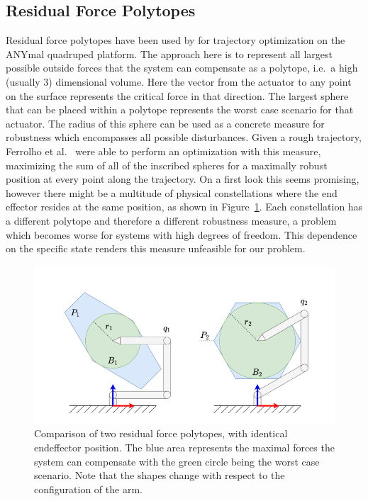 \subsection{Residual Force Polytopes} \label{Residual Force Polytopes}
Residual force polytopes have been used by \cite{respoly} for trajectory optimization on the ANYmal quadruped platform. The approach here is to represent all largest possible outside forces that the system can compensate as a polytope, i.e.\ a high (usually 3) dimensional volume. Here the vector from the actuator to any point on the surface represents the critical force in that direction. The largest sphere that can be placed within a polytope represents the worst case scenario for that actuator. The radius of this sphere can be used as a concrete measure for robustness which encompasses all possible disturbances. Given a rough trajectory, Ferrolho et al.\ \cite{anytraj} were able to perform an optimization with this measure, maximizing the sum of all of the inscribed spheres for a maximally robust position at every point along the trajectory. 
On a first look this seems promising, however there might be a multitude of physical constellations where the end effector resides at the same position, as shown in Figure~\ref{fig:resforce}. Each constellation has a different polytope and therefore a different robustness measure, a problem which becomes worse for systems with high degrees of freedom. This dependence on the specific state renders this measure unfeasible for our problem.
\begin{figure}[ht]
    \centering
    \includegraphics[width=\linewidth]{figures/resdidual_force_polytope}
    \caption[Residual Force Polytopes]{Comparison of two residual force polytopes, with identical endeffector position. The blue area represents the maximal forces the system can compensate with the green circle being the worst case scenario. Note that the shapes change with respect to the configuration of the arm.\cite{respoly}}
    \label{fig:resforce}
\end{figure}


